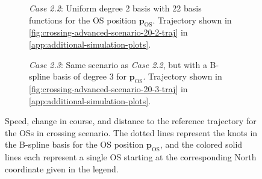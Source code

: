 \begin{figure}
    \centering
    \begin{subfigure}[b]{\textwidth}
        
        \caption{\emph{Case 2.2}: Uniform degree 2 basis with 22 basis functions for the OS position $\mathbf p_\text{OS}$. Trajectory shown in \cref{fig:crossing-advanced-scenario-20-2-traj} in \cref{app:additional-simulation-plots}.}
        \label{fig:crossing-advanced-scenario-20-2}
    \end{subfigure}
    \begin{subfigure}[b]{\textwidth}
        
        \caption{\emph{Case 2.3}: Same scenario as \emph{Case 2.2}, but with a B-spline basis of degree 3 for $\mathbf p_\text{OS}$. Trajectory shown in \cref{fig:crossing-advanced-scenario-20-3-traj} in \cref{app:additional-simulation-plots}.}
        \label{fig:crossing-advanced-scenario-20-3}
    \end{subfigure}
    \caption{Speed, change in course, and distance to the reference trajectory for the OSs in crossing scenario. The dotted lines represent the knots in the B-spline basis for the OS position $\mathbf p_\text{OS}$, and the colored solid lines each represent a single OS starting at the corresponding North coordinate given in the legend.}
    \label{fig:crossing-advanced-scenario-metrics}
\end{figure}



